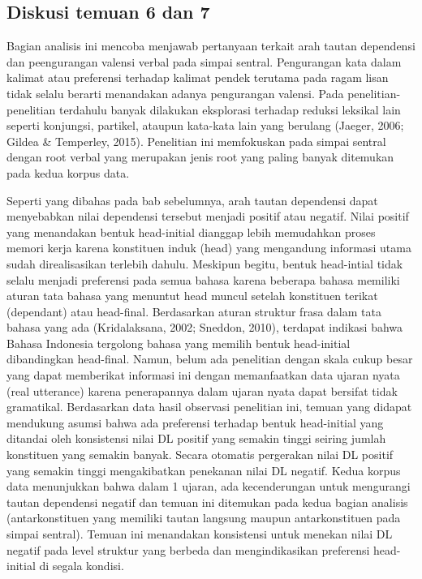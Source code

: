 \subsection{Diskusi temuan 6 dan 7}
Bagian analisis ini mencoba menjawab pertanyaan terkait arah tautan dependensi dan peengurangan valensi verbal pada simpai sentral. Pengurangan kata dalam kalimat atau preferensi terhadap kalimat pendek terutama pada ragam lisan tidak selalu berarti menandakan adanya pengurangan valensi. Pada penelitian-penelitian terdahulu banyak dilakukan eksplorasi terhadap reduksi leksikal lain seperti konjungsi, partikel, ataupun kata-kata lain yang berulang (Jaeger, 2006; Gildea & Temperley, 2015). Penelitian ini memfokuskan pada simpai sentral dengan root verbal yang merupakan jenis root yang paling banyak ditemukan pada kedua korpus data. 

Seperti yang dibahas pada bab sebelumnya, arah tautan dependensi dapat menyebabkan nilai dependensi tersebut menjadi positif atau negatif. Nilai positif yang menandakan bentuk head-initial dianggap lebih memudahkan proses memori kerja karena konstituen induk (head) yang mengandung informasi utama sudah direalisasikan terlebih dahulu. Meskipun begitu, bentuk head-intial tidak selalu menjadi preferensi pada semua bahasa karena beberapa bahasa memiliki aturan tata bahasa yang menuntut head muncul setelah konstituen terikat (dependant) atau head-final. Berdasarkan aturan struktur frasa dalam tata bahasa yang ada (Kridalaksana, 2002; Sneddon, 2010), terdapat indikasi bahwa Bahasa Indonesia tergolong bahasa yang memilih bentuk head-initial dibandingkan head-final. Namun, belum ada penelitian dengan skala cukup besar yang dapat memberikat informasi ini dengan memanfaatkan data ujaran nyata (real utterance) karena penerapannya dalam ujaran nyata dapat bersifat tidak gramatikal.  Berdasarkan data hasil observasi penelitian ini, temuan yang didapat mendukung asumsi bahwa ada preferensi terhadap bentuk head-initial yang ditandai oleh konsistensi nilai DL positif yang semakin tinggi seiring jumlah konstituen yang semakin banyak. Secara otomatis pergerakan nilai DL positif yang semakin tinggi mengakibatkan penekanan nilai DL negatif. Kedua korpus data menunjukkan bahwa dalam 1 ujaran, ada kecenderungan untuk mengurangi tautan dependensi negatif dan temuan ini ditemukan pada kedua bagian analisis (antarkonstituen yang memiliki tautan langsung maupun antarkonstituen pada simpai sentral). Temuan ini menandakan konsistensi untuk menekan nilai DL negatif pada level struktur yang berbeda dan mengindikasikan preferensi head-initial di segala kondisi. 

